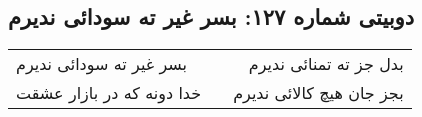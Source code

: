 \begin{center}
\section*{دوبیتی شماره ۱۲۷: بسر غیر ته سودائی ندیرم}
\label{sec:127}
\begin{longtable}{l p{0.5cm} r}
بسر غیر ته سودائی ندیرم
&&
بدل جز ته تمنائی ندیرم
\\
خدا دونه که در بازار عشقت
&&
بجز جان هیچ کالائی ندیرم
\\
\end{longtable}
\end{center}
